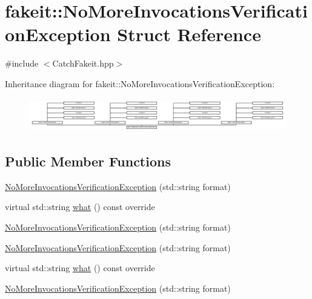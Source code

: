 \hypertarget{structfakeit_1_1NoMoreInvocationsVerificationException}{}\section{fakeit\+::No\+More\+Invocations\+Verification\+Exception Struct Reference}
\label{structfakeit_1_1NoMoreInvocationsVerificationException}


{\ttfamily \#include $<$Catch\+Fakeit.\+hpp$>$}

Inheritance diagram for fakeit\+::No\+More\+Invocations\+Verification\+Exception\+:\begin{figure}[H]
\begin{center}
\leavevmode
\includegraphics[height=1.468531cm]{structfakeit_1_1NoMoreInvocationsVerificationException}
\end{center}
\end{figure}
\subsection*{Public Member Functions}
\begin{DoxyCompactItemize}
\item 
\mbox{\hyperlink{structfakeit_1_1NoMoreInvocationsVerificationException_a086c23ab376d929b25310dfc4746ae69}{No\+More\+Invocations\+Verification\+Exception}} (std\+::string format)
\item 
virtual std\+::string \mbox{\hyperlink{structfakeit_1_1NoMoreInvocationsVerificationException_afbb7a2342bae73503d9fdc0a9f39c343}{what}} () const override
\item 
\mbox{\hyperlink{structfakeit_1_1NoMoreInvocationsVerificationException_a086c23ab376d929b25310dfc4746ae69}{No\+More\+Invocations\+Verification\+Exception}} (std\+::string format)
\item 
\mbox{\hyperlink{structfakeit_1_1NoMoreInvocationsVerificationException_a086c23ab376d929b25310dfc4746ae69}{No\+More\+Invocations\+Verification\+Exception}} (std\+::string format)
\item 
virtual std\+::string \mbox{\hyperlink{structfakeit_1_1NoMoreInvocationsVerificationException_afbb7a2342bae73503d9fdc0a9f39c343}{what}} () const override
\item 
\mbox{\hyperlink{structfakeit_1_1NoMoreInvocationsVerificationException_a086c23ab376d929b25310dfc4746ae69}{No\+More\+Invocations\+Verification\+Exception}} (std\+::string format)
\end{DoxyCompactItemize}
